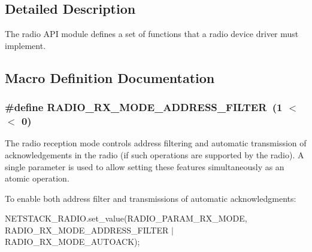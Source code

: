 \subsection{Detailed Description}
The radio A\+P\+I module defines a set of functions that a radio device driver must implement. 

\subsection{Macro Definition Documentation}
\hypertarget{group__radio_ga1c0277e7786bb04a0e0cf7cc80ad35a2}{}
\subsubsection[{R\+A\+D\+I\+O\+\_\+\+R\+X\+\_\+\+M\+O\+D\+E\+\_\+\+A\+D\+D\+R\+E\+S\+S\+\_\+\+F\+I\+L\+T\+E\+R}]{\setlength{\rightskip}{0pt plus 5cm}\#define R\+A\+D\+I\+O\+\_\+\+R\+X\+\_\+\+M\+O\+D\+E\+\_\+\+A\+D\+D\+R\+E\+S\+S\+\_\+\+F\+I\+L\+T\+E\+R~(1 $<$$<$ 0)}\label{group__radio_ga1c0277e7786bb04a0e0cf7cc80ad35a2}
The radio reception mode controls address filtering and automatic transmission of acknowledgements in the radio (if such operations are supported by the radio). A single parameter is used to allow setting these features simultaneously as an atomic operation.

To enable both address filter and transmissions of automatic acknowledgments\+:

N\+E\+T\+S\+T\+A\+C\+K\+\_\+\+R\+A\+D\+I\+O.\+set\+\_\+value(R\+A\+D\+I\+O\+\_\+\+P\+A\+R\+A\+M\+\_\+\+R\+X\+\_\+\+M\+O\+D\+E, R\+A\+D\+I\+O\+\_\+\+R\+X\+\_\+\+M\+O\+D\+E\+\_\+\+A\+D\+D\+R\+E\+S\+S\+\_\+\+F\+I\+L\+T\+E\+R $\vert$ R\+A\+D\+I\+O\+\_\+\+R\+X\+\_\+\+M\+O\+D\+E\+\_\+\+A\+U\+T\+O\+A\+C\+K); \hypertarget{group__radio_ga5f5b62a16d559e006cc34139fc59393b}{}
